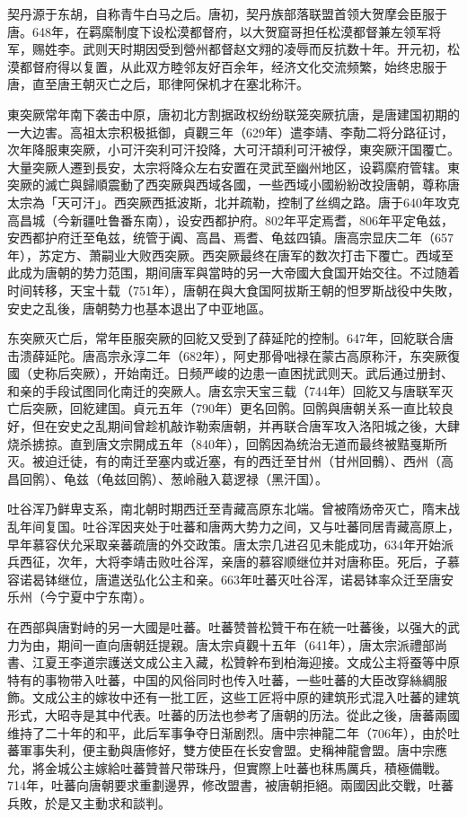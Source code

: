 契丹源于东胡，自称青牛白马之后。唐初，契丹族部落联盟首领大贺摩会臣服于唐。648年，在羁縻制度下设松漠都督府，以大贺窟哥担任松漠都督兼左领军将军，赐姓李。武则天时期因受到營州都督赵文翙的凌辱而反抗数十年。开元初，松漠都督府得以复置，从此双方睦邻友好百余年，经济文化交流频繁，始终忠服于唐，直至唐王朝灭亡之后，耶律阿保机才在塞北称汗。

東突厥常年南下袭击中原，唐初北方割据政权纷纷联笼突厥抗唐，是唐建国初期的一大边害。高祖太宗积极抵御，貞觀三年（629年）遣李靖、李勣二将分路征讨，次年降服東突厥，小可汗突利可汗投降，大可汗頡利可汗被俘，東突厥汗国覆亡。大量突厥人遷到長安，太宗将降众左右安置在灵武至幽州地区，设羁縻府管辖。東突厥的滅亡與歸順震動了西突厥與西域各國，一些西域小國紛紛改投唐朝，尊称唐太宗為「天可汗」。西突厥西抵波斯，北并疏勒，控制了丝绸之路。唐于640年攻克高昌城（今新疆吐鲁番东南），设安西都护府。802年平定焉耆，806年平定龟兹，安西都护府迁至龟兹，统管于阗、高昌、焉耆、龟兹四镇。唐高宗显庆二年（657年），苏定方、萧嗣业大败西突厥。西突厥最终在唐军的数次打击下覆亡。西域至此成为唐朝的势力范围，期间唐军與當時的另一大帝國大食国开始交往。不过随着时间转移，天宝十载（751年），唐朝在與大食国阿拔斯王朝的怛罗斯战役中失敗，安史之乱後，唐朝勢力也基本退出了中亚地區。

东突厥灭亡后，常年臣服突厥的回紇又受到了薛延陀的控制。647年，回紇联合唐击溃薛延陀。唐高宗永淳二年（682年），阿史那骨咄禄在蒙古高原称汗，东突厥復國（史称后突厥），开始南迁。日频严峻的边患一直困扰武则天。武后通过册封、和亲的手段试图同化南迁的突厥人。唐玄宗天宝三载（744年）回紇又与唐联军灭亡后突厥，回紇建国。貞元五年（790年）更名回鹘。回鹘與唐朝关系一直比较良好，但在安史之乱期间曾趁机敲诈勒索唐朝，并再联合唐军攻入洛阳城之後，大肆烧杀掳掠。直到唐文宗開成五年（840年），回鹘因為统治无道而最终被黠戛斯所灭。被迫迁徒，有的南迁至塞内或近塞，有的西迁至甘州（甘州回鶻）、西州（高昌回鹘）、龟兹（龟兹回鹘）、葱岭融入葛逻禄（黑汗国）。

吐谷浑乃鲜卑支系，南北朝时期西迁至青藏高原东北端。曾被隋炀帝灭亡，隋末战乱年间复国。吐谷浑因夹处于吐蕃和唐两大势力之间，又与吐蕃同居青藏高原上，早年慕容伏允采取亲蕃疏唐的外交政策。唐太宗几进召见未能成功，634年开始派兵西征，次年，大将李靖击败吐谷浑，亲唐的慕容顺继位并对唐称臣。死后，子慕容诺曷钵继位，唐遣送弘化公主和亲。663年吐蕃灭吐谷浑，诺曷钵率众迁至唐安乐州（今宁夏中宁东南）。

在西部與唐對峙的另一大國是吐蕃。吐蕃赞普松贊干布在統一吐蕃後，以强大的武力为由，期间一直向唐朝廷提親。唐太宗貞觀十五年（641年），唐太宗派禮部尚書、江夏王李道宗護送文成公主入藏，松贊幹布到柏海迎接。文成公主将蚕等中原特有的事物带入吐蕃，中国的风俗同时也传入吐蕃，一些吐蕃的大臣改穿絲綢服飾。文成公主的嫁妆中还有一批工匠，这些工匠将中原的建筑形式混入吐蕃的建筑形式，大昭寺是其中代表。吐蕃的历法也参考了唐朝的历法。從此之後，唐蕃兩國维持了二十年的和平，此后军事争夺日渐剧烈。唐中宗神龍二年（706年），由於吐蕃軍事失利，便主動與唐修好，雙方使臣在长安會盟。史稱神龍會盟。唐中宗應允，將金城公主嫁給吐蕃贊普尺带珠丹，但實際上吐蕃也秣馬厲兵，積極備戰。714年，吐蕃向唐朝要求重劃邊界，修改盟書，被唐朝拒絕。兩國因此交戰，吐蕃兵敗，於是又主動求和談判。


